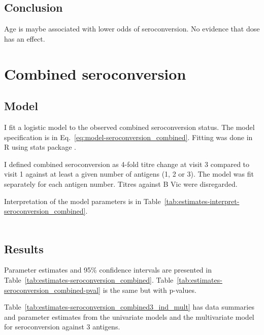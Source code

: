\documentclass[11pt]{article}
\begin{document}
\subsection{Conclusion}

Age is maybe associated with lower odds of seroconversion. No evidence that
dose has an effect.

\section{Combined seroconversion}

\subsection{Model}

I fit a logistic model to the observed combined seroconversion status.
The model specification is in Eq.~\ref{eq:model-seroconversion_combined}.
Fitting was done in R using stats package \cite{R}.

I defined combined seroconversion as 4-fold titre change at visit 3 compared
to visit 1 against
at least a given number of antigens (1, 2 or 3). The model was fit separately
for each antigen number.
Titres against B Vic were disregarded.

Interpretation of the model parameters is in
Table~\ref{tab:estimates-interpret-seroconversion_combined}.

\begin{equation}
    \begin{gathered}
        \label{eq:model-seroconversion_combined}
        
    \end{gathered}
\end{equation}





\subsection{Results}

Parameter estimates and 95\% confidence intervals
are presented in Table~\ref{tab:estimates-seroconversion_combined}.
Table~\ref{tab:estimates-seroconversion_combined-pval} is the same but with
p-values.

Table~\ref{tab:estimates-seroconversion_combined3_ind_mult} has data summaries
and parameter estimates from the univariate models and the multivariate model
for seroconversion against 3 antigens.
\end{document}
